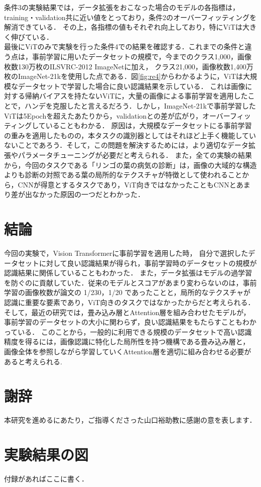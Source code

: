 \documentclass[a4paper, oneside, openany, dvipdfmx]{suribt}%
\newcommand{\fref}[1]{図\ref{#1}}
\begin{document}
条件3の実験結果では，データ拡張をおこなった場合のモデルの各指標は，training・validation共に近い値をとっており，条件2のオーバーフィッティングを解消できている．
その上，各指標の値もそれぞれ向上しており，特にViTは大きく伸びている．\\

最後にViTのみで実験を行った条件4での結果を確認する．これまでの条件と違う点は，事前学習に用いたデータセットの規模で，今までのクラス1,000，画像枚数130万枚のILSVRC-2012 ImageNetに加え，
クラス21,000，画像枚数1,400万枚のImageNet-21kを使用した点である．\fref{fig:re4}からわかるように，ViTは大規模なデータセットで学習した場合に良い認識結果を示している．
これは画像に対する帰納バイアスを持たないViTに，大量の画像による事前学習を適用したことで，ハンデを克服したと言えるだろう．しかし，ImageNet-21kで事前学習したViTは5Epochを超えたあたりから，validationとの差が広がり，オーバーフィッティングしていることもわかる．
原因は，大規模なデータセットにる事前学習の重みを適用したものの，本タスクの識別器としてはそれほど上手く機能していないことであろう．そして，この問題を解決するためには，より適切なデータ拡張やパラメータチューニングが必要だと考えられる．
また，全ての実験の結果から，今回のタスクである「リンゴの葉の病気の診断」は，画像の大域的な構造よりも診断の対照である葉の局所的なテクスチャが特徴として使われることから，CNNが得意とするタスクであり，ViT向きではなかったこともCNNとあまり差が出なかった原因の一つだとわかった．

\chapter{結論}
今回の実験で，Vision Transformerに事前学習を適用した時，
自分で選択したデータセットに対して良い認識結果が得られ，事前学習時のデータセットの規模が認識結果に関係していることもわかった．
また，データ拡張はモデルの過学習を防ぐのに貢献していた．従来のモデルとスコアがあまり変わらないのは，事前学習の画像枚数が論文の 1/230，1/20 であったことと，局所的なテクスチャが認識に重要な要素であり，ViT向きのタスクではなかったからだと考えられる．
そして，最近の研究では，畳み込み層とAttention層を組み合わせたモデルが，事前学習のデータセットの大小に関わらず，良い認識結果をもたらすこともわかっている\cite{dai2021coatnet}．
このことから，一般的に利用できる規模のデータセットで高い認識精度を得るには，画像認識に特化した局所性を持つ機構である畳み込み層と，
画像全体を参照しながら学習していくAttention層を適切に組み合わせる必要があると考えられる.

\backmatter%
\chapter{謝辞}%
本研究を進めるにあたり，ご指導くださった山口裕助教に感謝の意を表します．


\appendix%
\chapter{実験結果の図}
付録があればここに書く．
\end{document}
